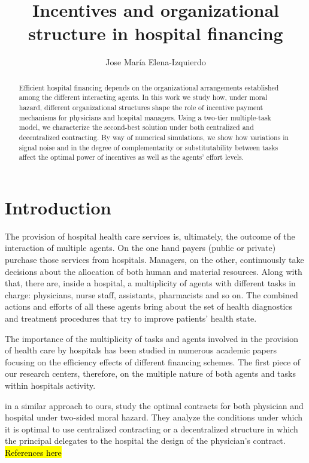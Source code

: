 \documentclass[12pt,letterpaper]{article}
\begin{document}
\title{\textbf{Incentives and organizational structure in hospital financing}\\{\small \textbf{}}}
\author{Jose María Elena-Izquierdo}
\date{}
\maketitle

\begin{abstract}
Efficient hospital financing depends on the organizational arrangements established among the different interacting agents. In this work we study how, under moral hazard, different organizational structures shape the role of incentive payment mechanisms for physicians and hospital managers. Using a two-tier multiple-task model, we characterize the second-best solution under both centralized and decentralized contracting. By way of numerical simulations, we show how variations in signal noise and in the degree of complementarity or substitutability between tasks affect the optimal power of incentives as well as the agents' effort levels.
\end{abstract}


\section*{Introduction}
The provision of hospital health care services is, ultimately, the outcome of the interaction of multiple agents. On the one hand payers (public or private) purchase those services from hospitals. Managers, on the other, continuously take decisions about the allocation of both human and material resources. Along with that, there are, inside a hospital, a multiplicity of agents with different tasks in charge: physicians, nurse staff, assistants, pharmacists and so on. The combined actions and efforts of all these agents bring about the set of health diagnostics and treatment procedures that try to improve patients'  health state.

The importance of the multiplicity of tasks and agents involved in the provision of health care by hospitals has been studied in numerous academic papers focusing on the efficiency effects of different financing schemes. The first piece of our research centers, therefore, on the multiple nature of both agents and tasks within hospitals activity.

\cite{JelovacMacho02} in a similar approach to ours, study the optimal contracts for both physician and hospital under two-sided moral hazard.  They analyze the conditions under which it is optimal to use centralized contracting or a decentralized structure in which the principal delegates to the hospital the design of the physician's contract.
\hl{References here}
\end{document}
